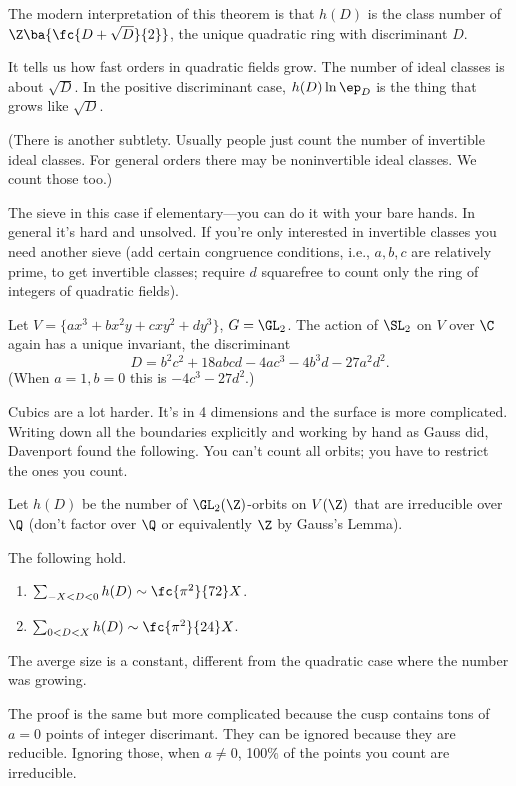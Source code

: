 The modern interpretation of this theorem is that $h(D)$ is the class number of $\Z\ba{\fc{D+\sqrt D}{2}}$, the unique quadratic ring with discriminant $D$. %

It tells us how fast orders in quadratic fields grow.  The number of ideal classes is about $\sqrt D$. In the positive discriminant case, $h(D)\ln \ep_D$ is the thing that grows like $\sqrt D$.

(There is another subtlety. Usually people just count the number of invertible ideal classes. For general orders there may be noninvertible ideal classes. We count those too.)

The sieve in this case if elementary---you can do it with your bare hands. In general it's hard and unsolved. If you're only interested in invertible classes you need another sieve (add certain congruence conditions, i.e., $a,b,c$ are relatively prime, to get invertible classes; require $d$ squarefree to count only the ring of integers of quadratic fields).

\begin{ex}
Let $V=\{ax^3 + bx^2y + cxy^2 + dy^3\}$, $G=\GL_2$. The action of $\SL_2$ on $V$ over $\C$ again has a unique invariant, the discriminant
\[
D = b^2c^2 + 18 abcd - 4 ac^3 - 4 b^3d - 27 a^2 d^2.
\]
(When $a=1,b=0$ this is $-4c^3-27d^2$.)
\end{ex}
Cubics are a lot harder. It's in 4 dimensions and the surface is more complicated. Writing down all the boundaries explicitly and working by hand as Gauss did, Davenport found the following. You can't count all orbits; you have to restrict the ones you count.

Let $h(D)$ be the number of $\GL_2(\Z)$-orbits on $V(\Z)$ that are irreducible over $\Q$ (don't factor over $\Q$ or equivalently $\Z$ by Gauss's Lemma). 
\begin{thm}[Davenport, 1960s]
The following hold.
\begin{enumerate}
\item
$\sum_{-X<D<0} h(D)\sim \fc{\pi^2}{72}X$.
\item
$\sum_{0<D<X} h(D) \sim \fc{\pi^2}{24}X$.
\end{enumerate}
\end{thm}
The averge size is a constant, different from the quadratic case where the number was growing.

The proof is the same but more complicated because the cusp contains tons of $a=0$ points of integer discrimant. They can be ignored because they are reducible. Ignoring those, when $a\ne 0$, 100$\%$ of the points you count are irreducible. 

